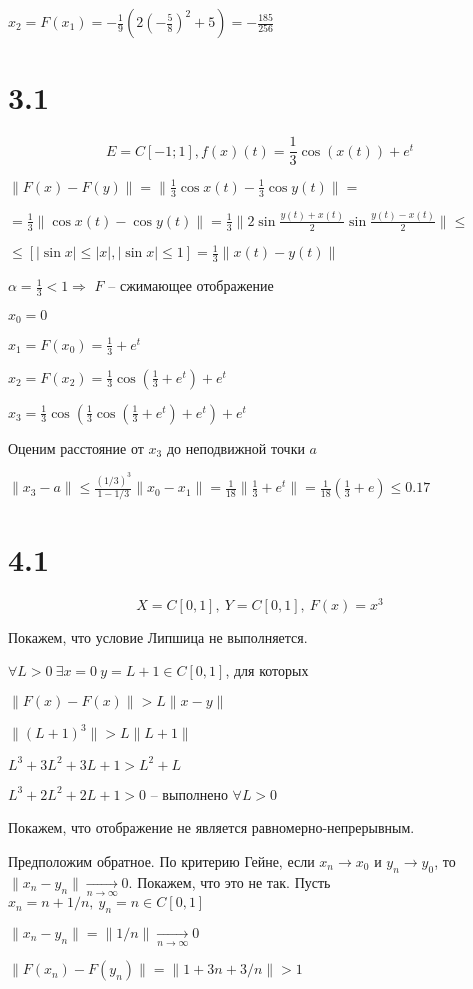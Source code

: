 \documentclass[a4paper]{article}
\begin{document}
$x_2 = F(x_1) = -\frac{1}{9} \left( 2 (-\frac{5}{8})^2 + 5 \right) = -\frac{185}{256}$


\section*{3.1}

\[ E = C[-1; 1], f(x)(t) = \frac{1}{3} \cos(x(t)) + e^t \]

$\|F(x) - F(y)\| = \| \frac{1}{3} \cos x(t) - \frac{1}{3} \cos y(t) \| = $

$=\frac{1}{3} \| \cos x(t) - \cos y(t) \| = \frac{1}{3} \| 2 \sin \frac{y(t) + x(t)}{2} 
\sin  \frac{y(t) - x(t)}{2} \| \le$


$\le [|\sin x | \le |x|, |\sin x| \le 1] = \frac{1}{3} \| x(t) - y(t) \|$

$\alpha = \frac{1}{3} < 1 \Rightarrow$ $F$ -- сжимающее отображение

$x_0 = 0$

$x_1 = F(x_0) = \frac{1}{3} + e^t$

$x_2 = F(x_2) = \frac{1}{3} \cos \left( \frac{1}{3} + e^t \right) + e^t$

$x_3 = \frac{1}{3} \cos \left( \frac{1}{3} \cos \left( \frac{1}{3} + e^t \right) + e^t \right) + e^t$

Оценим расстояние от $x_3$ до неподвижной точки $a$

$\| x_3 - a \| \le \frac{(1/3)^3}{1 - 1/3} \| x_0 - x_1 \| = \frac{1}{18}
 \| \frac{1}{3} + e^t \| =  \frac{1}{18} \left( \frac{1}{3} + e \right) \le 0.17$


 \section*{4.1}

 \[ X = C[0, 1],\ Y = C[0,1],\ F(x) = x^3 \]

 Покажем, что условие Липшица не выполняется.

 $\forall L > 0\ \exists x=0\ y=L+1 \in C[0, 1]$, для которых
 
 $\|F(x) - F(x)\| > L \| x - y \|$

 $\|(L+1)^3\| > L \| L+1\|$

 $L^3 + 3L^2 + 3L+1 > L^2 + L$

 $L^3 + 2L^2 + 2L + 1 > 0$ -- выполнено $\forall L > 0$

 Покажем, что отображение не является равномерно-непрерывным.

 Предположим обратное. По критерию Гейне, если $x_n \to x_0$ и $y_n \to y_0$, то $\| x_n - y_n\| \xrightarrow[n\to \infty]{}0$. Покажем, что это не так. Пусть $x_n = n+ 1/n, \ y_n = n \in C[0,1]$

 $\| x_n - y_n\| = \| 1/n \| \xrightarrow[n\to \infty]{} 0$

 $\| F(x_n) - F(y_n) \| = \| 1 + 3n + 3/n\| > 1$
\end{document}
